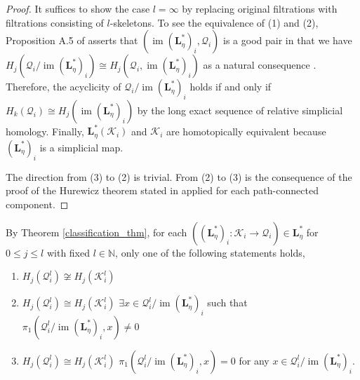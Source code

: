 \documentclass[11pt]{article}
\newcommand{\N}{\mathbb{N}} %
\newcommand{\im}{\operatorname{im}}
\newcommand{\matL}{\mathbf{L}} %
\begin{document}
\begin{proof}
	It suffices to show the case $l=\infty$ by replacing original filtrations with filtrations consisting of $l$-skeletons.  To see the equivalence of (1) and (2), Proposition A.5 of \cite{hatcher} asserts that $\left(\im \left(\matL^{\ast}_{\eta}\right)_{i}, \mathcal{Q}_{i}\right)$ is a good pair in that we have $H_{j}\left(\mathcal{Q}_{i}/\im\left(\matL^{\ast}_{\eta}\right)_{i}\right) \cong H_{j}\left(\mathcal{Q}_{i}, \im\left(\matL^{\ast}_{\eta}\right)_{i}\right)$ as a natural consequence \cite[Proposition 2.22]{hatcher}. Therefore, the acyclicity of $\mathcal{Q}_{i}/\im\left(\matL^{\ast}_{\eta}\right)_{i}$ holds if and only if $H_{k}(\mathcal{Q}_{i}) \cong H_{j}\left(\im\left(\matL^{\ast}_{\eta}\right)_{i}\right)$ by the long exact sequence of relative simplicial homology. Finally, $\matL^{\ast}_{\eta}(\mathcal{K}_{i})$ and $\mathcal{K}_{i}$ are homotopically equivalent because $\left(\matL^{\ast}_{\eta}\right)_{i}$ is a simplicial map.
	
	The direction from (3) to (2) is trivial. From (2) to (3) is the consequence of the proof of the Hurewicz theorem stated in \cite[Corollary 4.33]{hatcher} applied for each path-connected component. 
\end{proof}

By Theorem \ref{classification_thm}, for each $\left(\left(\matL^{\ast}_{\eta}\right)_{i}:\mathcal{K}_{i} \to \mathcal{Q}_{i}\right) \in \matL^{\ast}_{\eta}$ for $0 \leq j \leq l$ with fixed $l \in\N$, only one of the following statements holds,
\begin{enumerate}
	\item $H_{j}(\mathcal{Q}_{i}^{l}) \not\cong H_{j}(\mathcal{K}_{i}^{l})$
	\item $H_{j}(\mathcal{Q}_{i}^{l}) \cong H_{j}(\mathcal{K}_{i}^{l})$  $\exists x \in \mathcal{Q}_{i}^{l}/\im\left(\matL^{\ast}_{\eta}\right)_{i}$ such that $\pi_{1}(\mathcal{Q}_{i}^{l}/\im\left(\matL^{\ast}_{\eta}\right)_{i},x) \neq0$
	\item $H_{j}(\mathcal{Q}_{i}^{l}) \cong H_{j}(\mathcal{K}_{i}^{l})$  $\pi_{1}(\mathcal{Q}_{i}^{l}/\im\left(\matL^{\ast}_{\eta}\right)_{i},x) =0$ for any $x \in \mathcal{Q}_{i}^{l}/\im\left(\matL^{\ast}_{\eta}\right)_{i}$.
\end{enumerate}
\end{document}

